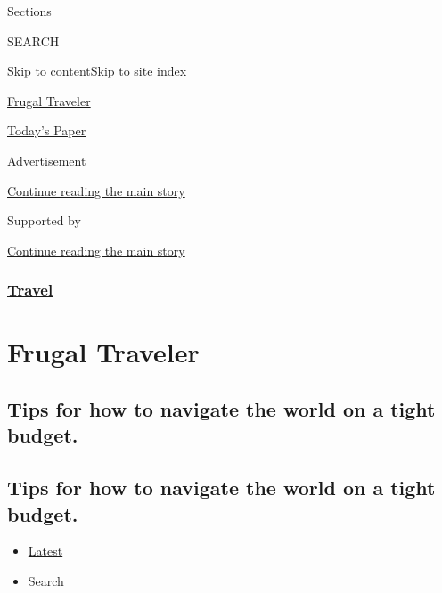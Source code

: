 Sections

SEARCH

\protect\hyperlink{site-content}{Skip to
content}\protect\hyperlink{site-index}{Skip to site index}

\href{https://www.nytimes.com/column/frugal-traveler}{Frugal Traveler}

\href{https://myaccount.nytimes.com/auth/login?response_type=cookie\&client_id=vi}{}

\href{https://www.nytimes.com/section/todayspaper}{Today's Paper}

Advertisement

\protect\hyperlink{after-top}{Continue reading the main story}

Supported by

\protect\hyperlink{after-sponsor}{Continue reading the main story}

\hypertarget{travel}{%
\subsubsection{\texorpdfstring{\href{/section/travel}{Travel}}{Travel}}\label{travel}}

\hypertarget{frugal-traveler}{%
\section{Frugal Traveler}\label{frugal-traveler}}

\hypertarget{tips-for-how-to-navigate-the-world-on-a-tight-budget}{%
\subsection{Tips for how to navigate the world on a tight
budget.}\label{tips-for-how-to-navigate-the-world-on-a-tight-budget}}

\hypertarget{tips-for-how-to-navigate-the-world-on-a-tight-budget-1}{%
\subsection{Tips for how to navigate the world on a tight
budget.}\label{tips-for-how-to-navigate-the-world-on-a-tight-budget-1}}

\begin{itemize}
\tightlist
\item
  \protect\hyperlink{stream-panel}{Latest}
\item
  Search
\end{itemize}

